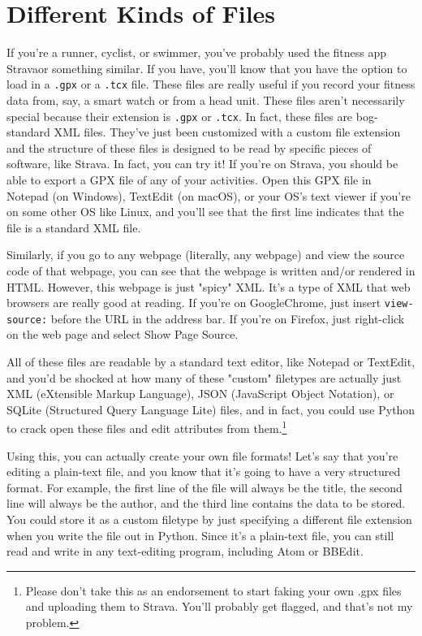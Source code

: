 \section{Different Kinds of Files}
If you're a runner, cyclist, or swimmer, you've probably used the fitness app Strava\textregistered or something similar. If you have, you'll know that you have the option to load in a \verb|.gpx| or a \verb|.tcx| file. These files are really useful if you record your fitness data from, say, a smart watch or from a head unit. These files aren't necessarily special because their extension is \verb|.gpx| or \verb|.tcx|. In fact, these files are bog-standard XML files. They've just been customized with a custom file extension and the structure of these files is designed to be read by specific pieces of software, like Strava\textregistered. In fact, you can try it! If you're on Strava\textregistered, you should be able to export a GPX file of any of your activities. Open this GPX file in Notepad (on Windows), TextEdit (on macOS), or your OS's text viewer if you're on some other OS like Linux, and you'll see that the first line indicates that the file is a standard XML file.\par
Similarly, if you go to any webpage (literally, any webpage) and view the source code of that webpage, you can see that the webpage is written and/or rendered in HTML. However, this webpage is just "spicy" XML. It's a type of XML that web browsers are really good at reading. If you're on Google\textregistered Chrome\textregistered, just insert \verb|view-source:| before the URL in the address bar. If you're on Firefox, just right-click on the web page and select Show Page Source.\par
All of these files are readable by a standard text editor, like Notepad or TextEdit, and you'd be shocked at how many of these "custom" filetypes are actually just XML (eXtensible Markup Language), JSON (JavaScript Object Notation), or SQLite (Structured Query Language Lite) files, and in fact, you could use Python to crack open these files and edit attributes from them.\footnote{Please don't take this as an endorsement to start faking your own .gpx files and uploading them to Strava\textregistered. You'll probably get flagged, and that's not my problem.}\par
Using this, you can actually create your own file formats! Let's say that you're editing a plain-text file, and you know that it's going to have a very structured format. For example, the first line of the file will always be the title, the second line will always be the author, and the third line contains the data to be stored. You could store it as a custom filetype by just specifying a different file extension when you write the file out in Python. Since it's a plain-text file, you can still read and write in any text-editing program, including Atom or BBEdit\textregistered.\par